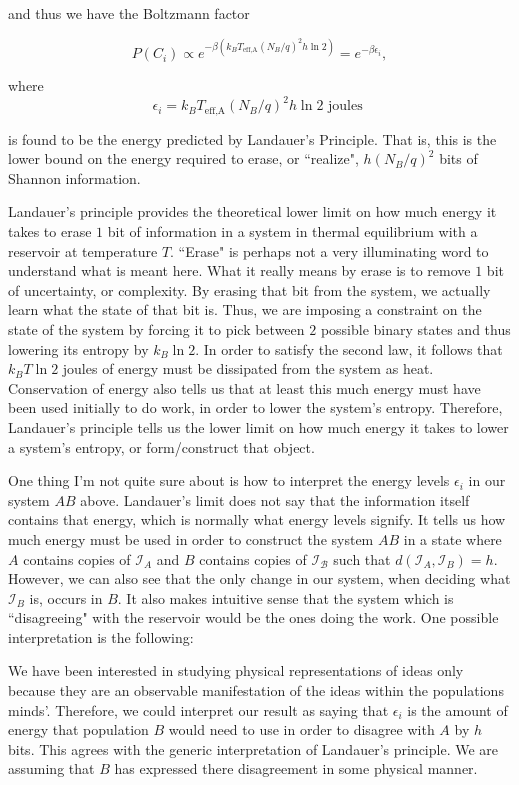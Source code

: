 \documentclass{article}
\begin{document}
and thus we have the Boltzmann factor

\[ P(C_i) \propto e^{-\beta(k_BT_\text{eff,A}(N_B/q)^2h\ln{2})} = e^{-\beta\epsilon_i}, \]

where \[ \epsilon_i = k_BT_\text{eff,A}(N_B/q)^2h\ln{2} \text{ joules }\]

is found to be the energy predicted by Landauer's Principle. That is, this is the lower bound on the energy required to erase, or ``realize", $h(N_B/q)^2$ bits of Shannon information.

Landauer's principle provides the theoretical lower limit on how much energy it takes to erase $1$ bit of information in a system in thermal equilibrium with a reservoir at temperature $T$. ``Erase" is perhaps not a very illuminating word to understand what is meant here. What it really means by erase is to remove $1$ bit of uncertainty, or complexity. By erasing that bit from the system, we actually learn what the state of that bit is. Thus, we are imposing a constraint on the state of the system by forcing it to pick between $2$ possible binary states and thus lowering its entropy by $k_B\ln2$. In order to satisfy the second law, it follows that $k_BT\ln2$ joules of energy must be dissipated from the system as heat. Conservation of energy also tells us that at least this much energy must have been used initially to do work, in order to lower the system's entropy. Therefore, Landauer's principle tells us the lower limit on how much energy it takes to lower a system's entropy, or form/construct that object. 

One thing I'm not quite sure about is how to interpret the energy levels $\epsilon_i$ in our system $AB$ above. Landauer's limit does not say that the information itself contains that energy, which is normally what energy levels signify. It tells us how much energy must be used in order to construct the system $AB$ in a state where $A$ contains copies of $\mathcal{I}_A$ and $B$ contains copies of $\mathcal{I_B}$ such that $d(\mathcal{I}_A, \mathcal{I}_B)=h$. However, we can also see that the only change in our system, when deciding what $\mathcal{I}_B$ is, occurs in $B$. It also makes intuitive sense that the system which is ``disagreeing" with the reservoir would be the ones doing the work. One possible interpretation is the following: 

We have been interested in studying physical representations of ideas only because they are an observable manifestation of the ideas within the populations minds'. Therefore, we could interpret our result as saying that $\epsilon_i$ is the amount of energy that population $B$ would need to use in order to disagree with $A$ by $h$ bits. This agrees with the generic interpretation of Landauer's principle. We are assuming that $B$ has expressed there disagreement in some physical manner.
\end{document}
